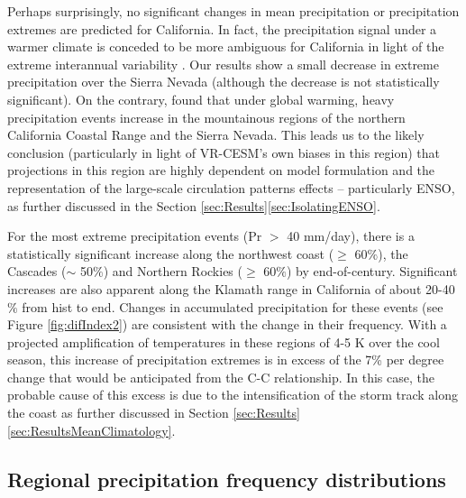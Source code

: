 \documentclass{ametsoc}
\begin{document}
Perhaps surprisingly, no significant changes in mean precipitation or precipitation extremes are predicted for California.  In fact, the precipitation signal under a warmer climate is conceded to be more ambiguous for California \citep{neelin2013california} in light of the extreme interannual variability \citep{dettinger2011climate}. Our results show a small decrease in extreme precipitation over the Sierra Nevada (although the decrease is not statistically significant). On the contrary, \cite{kim2005projection} found that under global warming, heavy precipitation events increase in the mountainous regions of the northern California Coastal Range and the Sierra Nevada. This leads us to the likely conclusion (particularly in light of VR-CESM's own biases in this region) that projections in this region are highly dependent on model formulation and the representation of the large-scale circulation patterns effects -- particularly ENSO, as further discussed in the Section \ref{sec:Results}\ref{sec:IsolatingENSO}. 


For the most extreme precipitation events (Pr $>$ 40 mm/day), there is a statistically significant increase along the northwest coast ($\geq$ 60$\%$), the Cascades ($\sim$ 50$\%$) and Northern Rockies ($\geq$ 60$\%$) by end-of-century. Significant increases are also apparent along the Klamath range in California of about 20-40$\%$ from \textsf{hist} to \textsf{end}. Changes in accumulated precipitation for these events (see Figure \ref{fig:difIndex2}) are consistent with the change in their frequency.  With a projected amplification of temperatures in these regions of 4-5 K over the cool season, this increase of precipitation extremes is in excess of the 7\% per degree change that would be anticipated from the C-C relationship.  In this case, the probable cause of this excess is due to the intensification of the storm track along the coast as further discussed in Section \ref{sec:Results}\ref{sec:ResultsMeanClimatology}.


\subsection{Regional precipitation frequency distributions}
\end{document}
